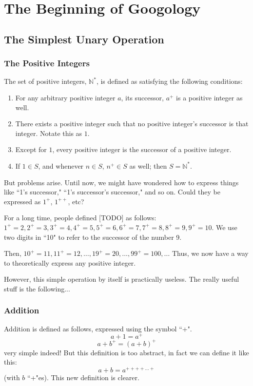 \chapter{The Beginning of Googology} %

\section{The Simplest Unary Operation}

\subsection{The Positive Integers}
The set of positive integers, $\mathbb{N}^*$, is defined as satisfying the following conditions:
\begin{enumerate}
	\item For any arbitrary positive integer $a$, its successor, $a^+$ is a positive integer as well.
	\item There exists a positive integer such that no positive integer's successor is that integer. Notate this as $1$.
	\item Except for $1$, every positive integer is the successor of a positive integer.
	\item If $1 \in S$, and whenever $n \in S$, $n^+ \in S$ as well; then $S = \mathbb{N}^*$.
\end{enumerate}

But problems arise. Until now, we might have wondered how to express things like ``1's successor," ``1's successor's successor," and so on.
Could they be expressed as $1^+$, $1^{++}$, etc?

For a long time, people defined [TODO] as follows: $1^+=2, 2^+=3, 3^+=4, 4^+=5, 5^+=6, 6^+=7, 7^+=8, 8^+=9, 9^+=10.$ 
We use two digits in ``10" to refer to the successor of the number 9.

Then, $10^+=11, 11^+=12, \ldots, 19^+=20, \ldots, 99^+=100, \ldots$
Thus, we now have a way to theoretically express any positive integer.

However, this simple operation by itself is practically useless. The really useful stuff is the following...

\subsection{Addition}
Addition is defined as follows, expressed using the symbol ``+".
	$$ a+1=a^+ $$
	$$ a+b^+=(a+b)^+ $$
very simple indeed! But this definition is too abstract, in fact we can define it like this:
	$$ a+b=a^{++++\ldots+} $$
(with $b$ ``+"es). This new definition is clearer.

